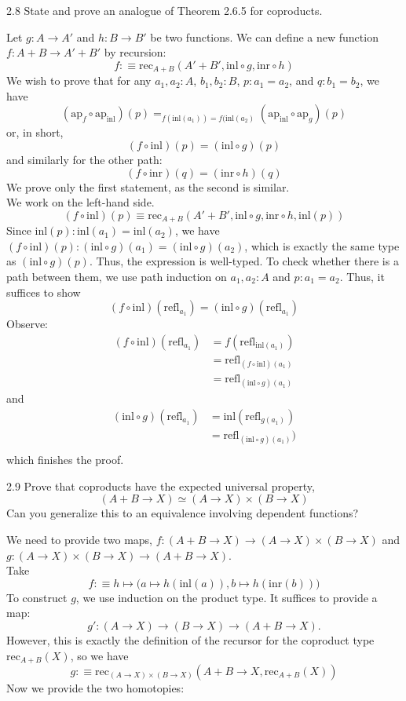 \documentclass[14pt]{extarticle}
\newcommand{\0}{{\mathbf 0}}
\newcommand{\1}{{\mathbf 1}}
\newcommand{\2}{{\mathbf 2}}
\newcommand{\mt}{\mapsto}
\newcommand{\rec}{\mathrm{rec}}
\newcommand{\refl}{\mathrm{refl}}
\newcommand{\inl}{\mathrm{inl}}
\newcommand{\inr}{\mathrm{inr}}
\newcommand{\ap}{\mathrm{ap}}
\begin{document}
\begin{prob}{2.8}{}
State and prove an analogue of Theorem 2.6.5 for coproducts.
\end{prob}
Let $g : A \to A'$ and $h : B \to B'$ be two functions. We can define a new function $f : A + B \to A' + B'$ by recursion:
\[f :\equiv \rec_{A+B}(A' + B',\inl \circ g, \inr \circ h)\]
We wish to prove that for any $a_1,a_2 : A$, $b_1,b_2 : B$, $p : a_1 = a_2$, and $q : b_1 = b_2$, we have
\[(\ap_f \circ \ap_{\inl})(p) =_{f(\inl(a_1)) = f(\inl(a_2)}(\ap_\inl \circ \ap_g)(p)\]
or, in short,
\[(f \circ \inl)(p) = (\inl \circ g)(p)\]
and similarly for the other path:
\[(f \circ \inr)(q) = (\inr \circ h)(q)\]
We prove only the first statement, as the second is similar.\\
We work on the left-hand side.
\[(f \circ \inl)(p) \equiv \rec_{A+B}(A' + B',\inl \circ g, \inr \circ h, \inl(p))\]
Since $\inl(p) : \inl(a_1) = \inl(a_2)$, we have $(f \circ \inl)(p) : (\inl \circ g)(a_1) = (\inl \circ g)(a_2)$, which is exactly the same type as $(\inl \circ g)(p)$. Thus, the expression is well-typed. To check whether there is a path between them, we use path induction on $a_1,a_2 : A$ and $p : a_1 = a_2$. Thus, it suffices to show
\[(f \circ \inl)(\refl_{a_1}) = (\inl \circ g)(\refl_{a_1})\]
Observe:
\begin{align*}
(f \circ \inl)(\refl_{a_1}) &= f(\refl_{\inl(a_1)})\\
&= \refl_{(f\circ \inl)(a_1)}\\
&= \refl_{(\inl \circ g)(a_1)}
\end{align*}
and 
\begin{align*}
(\inl \circ g)(\refl_{a_1}) &= \inl(\refl_{g(a_1)}) \\
&= \refl_{(\inl \circ g)(a_1)}) \\
\end{align*}
which finishes the proof.


\begin{prob}{2.9}{}
Prove that coproducts have the expected universal property, \[(A + B \to X) \simeq (A \to X) \times (B \to X)\]
Can you generalize this to an equivalence involving dependent functions?
\end{prob}
We need to provide two maps, $f : (A + B \to X) \to (A \to X) \times (B \to X)$ and $g :  (A \to X) \times (B \to X) \to (A + B \to X)$. \\
Take \[f :\equiv h \mt \Big(a \mt h(\inl(a)),b \mt h(\inr(b))\Big)\]
To construct $g$, we use induction on the product type. It suffices to provide a map:
\[g' : (A \to X) \to (B \to X) \to (A + B \to X).\] However, this is exactly the definition of the recursor for the coproduct type $\rec_{A+B}(X)$, so we have
\[g :\equiv \rec_{(A \to X) \times (B \to X)}(A+B \to X, \rec_{A+B}(X))\]
Now we provide the two homotopies:
\end{document}
